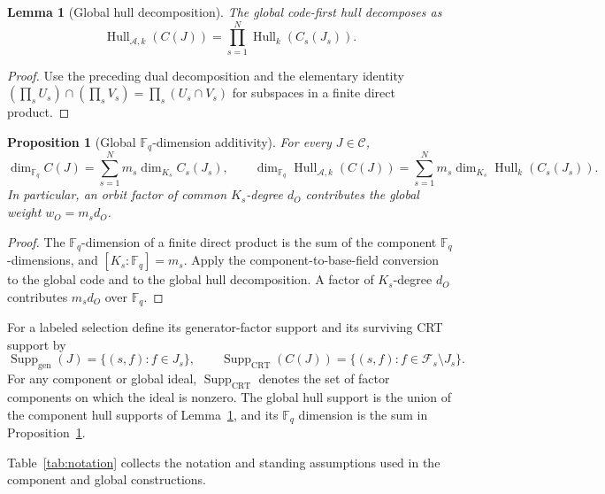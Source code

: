 \documentclass[11pt]{article}
\newcommand{\F}{\mathbb F}
\newcommand{\A}{\mathcal A}
\newcommand{\Fs}{\mathcal F_s}
\newcommand{\Hull}{\operatorname{Hull}}
\theoremstyle{plain}
\newtheorem{lemma}{Lemma}
\newtheorem{proposition}{Proposition}
\theoremstyle{definition}
\theoremstyle{remark}
\begin{document}
\begin{lemma}[Global hull decomposition]\label{lem:global-hull}
The global code-first hull decomposes as
\[
\Hull_{\A,k}(C(J))
 =\prod_{s=1}^{N}\Hull_k(C_s(J_s)).
\]
\end{lemma}

\begin{proof}
Use the preceding dual decomposition and the elementary identity
$(\prod_s U_s)\cap(\prod_s V_s)=\prod_s(U_s\cap V_s)$ for subspaces in a finite direct product.
\end{proof}

\begin{proposition}[Global $\F_q$-dimension additivity]\label{prop:global-dimensions}
For every $J\in\mathscr C$,
\[
\dim_{\F_q}C(J)=\sum_{s=1}^{N}m_s\dim_{K_s}C_s(J_s),
\qquad
\dim_{\F_q}\Hull_{\A,k}(C(J))
 =\sum_{s=1}^{N}m_s\dim_{K_s}\Hull_k(C_s(J_s)).
\]
In particular, an orbit factor of common $K_s$-degree $d_O$ contributes the global weight $w_O=m_s d_O$.
\end{proposition}

\begin{proof}
The $\F_q$-dimension of a finite direct product is the sum of the component $\F_q$-dimensions, and $[K_s:\F_q]=m_s$. Apply the component-to-base-field conversion to the global code and to the global hull decomposition. A factor of $K_s$-degree $d_O$ contributes $m_s d_O$ over $\F_q$.
\end{proof}

For a labeled selection define its generator-factor support and its surviving CRT support by
\[
\operatorname{Supp}_{\mathrm{gen}}(J)=\{(s,f):f\in J_s\},
\qquad
\operatorname{Supp}_{\mathrm{CRT}}(C(J))
 =\{(s,f):f\in\Fs\setminus J_s\}.
\]
For any component or global ideal, $\operatorname{Supp}_{\mathrm{CRT}}$ denotes the set of factor components on which the ideal is nonzero. The global hull support is the union of the component hull supports of Lemma~\ref{lem:global-hull}, and its $\F_q$ dimension is the sum in Proposition~\ref{prop:global-dimensions}.

Table~\ref{tab:notation} collects the notation and standing assumptions used in the component and global constructions.
\end{document}
